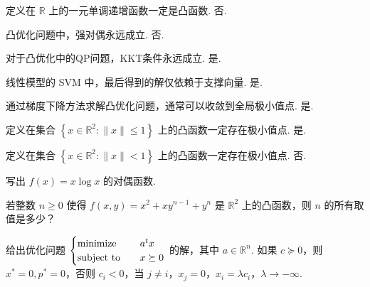 \begin{problem}[判断]
    定义在 $\mathbb{R}$ 上的一元单调递增函数一定是凸函数.
    \Answer 否.
\end{problem}

\begin{problem}[判断]
    凸优化问题中，强对偶永远成立.
    \Answer 否.
\end{problem}

\begin{problem}[判断]
    对于凸优化中的QP问题，KKT条件永远成立.
    \Answer 是.
\end{problem}

\begin{problem}[判断]
    线性模型的 SVM 中，最后得到的解仅依赖于支撑向量.
    \Answer 是.
\end{problem}

\begin{problem}[判断]
    通过梯度下降方法求解凸优化问题，通常可以收敛到全局极小值点.
    \Answer 是.
\end{problem}

\begin{problem}[判断]
    定义在集合 $\left\{x \in \mathbb{R}^2: \|x\| \le 1\right\}$ 上的凸函数一定存在极小值点.
    \Answer 是.
\end{problem}

\begin{problem}[判断]
    定义在集合 $\left\{x \in \mathbb{R}^2: \|x\| < 1\right\}$ 上的凸函数一定存在极小值点.
    \Answer 否.
\end{problem}

\begin{problem}[问答]
    写出 $f(x) = x\log x$ 的对偶函数.
    \Answer 
\end{problem}

\begin{problem}[问答]
    若整数 $n \ge 0$ 使得 $f(x, y) = x^2 + xy^{n - 1} + y^n$ 是 $\mathbb{R}^2$ 上的凸函数，则 $n$ 的所有取值是多少？
    \Answer 
\end{problem}

\begin{problem}[问答]
    给出优化问题 $\begin{cases}
        \operatorname{minimize} \quad & a^tx\\
        \operatorname{subject\ to} \quad & x \succeq 0
    \end{cases}$ 的解，其中 $a\in \mathbb{R}^n$.
    \Answer 如果 $c \succeq 0$，则 $x^* = 0, p^* = 0$，否则 $c_i < 0$，当 $j \neq i$，$x_j = 0$，$x_i = \lambda c_i$，$\lambda \to -\infty$.
\end{problem}

